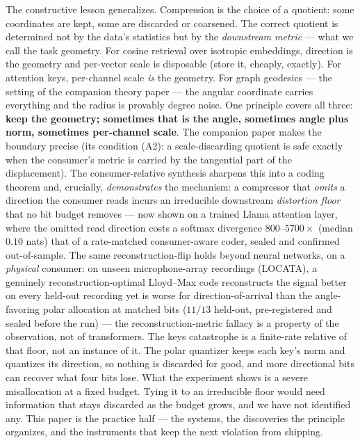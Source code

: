 \documentclass[11pt]{article}
\begin{document}
The constructive lesson generalizes. Compression is the choice of a quotient:
some coordinates are kept, some are discarded or coarsened. The correct
quotient is determined not by the data's statistics but by the
\emph{downstream metric} --- what we call the task geometry. For cosine
retrieval over isotropic embeddings, direction is the geometry and per-vector
scale is disposable (store it, cheaply, exactly). For attention keys,
per-channel scale \emph{is} the geometry. For graph geodesics --- the setting
of the companion theory paper \cite{kta} --- the angular coordinate carries
everything and the radius is provably degree noise. One principle covers all
three: \textbf{keep the geometry; sometimes that is the angle, sometimes
angle plus norm, sometimes per-channel scale}. The companion paper makes the
boundary precise (its condition (A2): a scale-discarding quotient is safe
exactly when the consumer's metric is carried by the tangential part of the
displacement). The consumer-relative synthesis \cite{obstheory} sharpens this
into a coding theorem and, crucially, \emph{demonstrates} the mechanism: a
compressor that \emph{omits} a direction the consumer reads incurs an
irreducible downstream \emph{distortion floor} that no bit budget removes ---
now shown on a trained Llama attention layer, where the omitted read direction
costs a softmax divergence $800$--$5700\times$ (median $0.10$ nats) that of a
rate-matched consumer-aware coder, sealed and confirmed out-of-sample. The same
reconstruction-flip holds beyond neural networks, on a \emph{physical} consumer: on
unseen microphone-array recordings (LOCATA), a genuinely reconstruction-optimal
Lloyd--Max code reconstructs the signal better on every held-out recording yet is
worse for direction-of-arrival than the angle-favoring polar allocation at matched
bits ($11/13$ held-out, pre-registered and sealed before the run) --- the
reconstruction-metric fallacy is a property of the observation, not of transformers.
The keys catastrophe is a finite-rate relative of that floor, not an instance of it.
The polar quantizer keeps each key's norm and quantizes its direction, so nothing is
discarded for good, and more directional bits can recover what four bits lose. What the
experiment shows is a severe misallocation at a fixed budget. Tying it to an irreducible
floor would need information that stays discarded as the budget grows, and we have not
identified any. This paper is the practice half --- the systems, the
discoveries the principle organizes, and the instruments that keep the next
violation from shipping.
\end{document}
